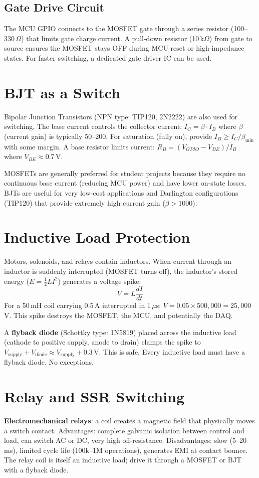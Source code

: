 \documentclass[11pt,letterpaper,twoside,openany]{book}
\begin{document}
\subsection{Gate Drive Circuit}
The MCU GPIO connects to the MOSFET gate through a series resistor (100--330\,$\Omega$) that limits gate charge current. A pull-down resistor (10\,k$\Omega$) from gate to source ensures the MOSFET stays OFF during MCU reset or high-impedance states. For faster switching, a dedicated gate driver IC can be used.

\section{BJT as a Switch}
Bipolar Junction Transistors (NPN type: TIP120, 2N2222) are also used for switching. The base current controls the collector current: $I_C = \beta \cdot I_B$ where $\beta$ (current gain) is typically 50--200. For saturation (fully on), provide $I_B \geq I_C / \beta_{\min}$ with some margin. A base resistor limits current: $R_B = (V_{GPIO} - V_{BE})/I_B$ where $V_{BE} \approx 0.7$\,V.

MOSFETs are generally preferred for student projects because they require no continuous base current (reducing MCU power) and have lower on-state losses. BJTs are useful for very low-cost applications and Darlington configurations (TIP120) that provide extremely high current gain ($\beta > 1000$).

\section{Inductive Load Protection}
Motors, solenoids, and relays contain inductors. When current through an inductor is suddenly interrupted (MOSFET turns off), the inductor's stored energy ($E = \frac{1}{2}LI^2$) generates a voltage spike:
\begin{equation}
V = L \frac{dI}{dt}
\end{equation}
For a 50\,mH coil carrying 0.5\,A interrupted in 1\,$\mu$s: $V = 0.05 \times 500{,}000 = 25{,}000$\,V. This spike destroys the MOSFET, the MCU, and potentially the DAQ.

A \textbf{flyback diode} (Schottky type: 1N5819) placed across the inductive load (cathode to positive supply, anode to drain) clamps the spike to $V_{\text{supply}} + V_{\text{diode}} \approx V_{\text{supply}} + 0.3$\,V. This is safe. Every inductive load must have a flyback diode. No exceptions.

\section{Relay and SSR Switching}
\textbf{Electromechanical relays}: a coil creates a magnetic field that physically moves a switch contact. Advantages: complete galvanic isolation between control and load, can switch AC or DC, very high off-resistance. Disadvantages: slow (5--20\,ms), limited cycle life (100k--1M operations), generates EMI at contact bounce. The relay coil is itself an inductive load; drive it through a MOSFET or BJT with a flyback diode.
\end{document}
